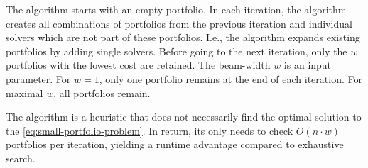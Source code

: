 The algorithm starts with an empty portfolio.
In each iteration, the algorithm creates all combinations of portfolios from the previous iteration and individual solvers which are not part of these portfolios.
I.e., the algorithm expands existing portfolios by adding single solvers.
Before going to the next iteration, only the $w$ portfolios with the lowest cost are retained.
The beam-width $w$ is an input parameter.
For $w=1$, only one portfolio remains at the end of each iteration.
For maximal $w$, all portfolios remain.

The algorithm is a heuristic that does not necessarily find the optimal solution to the \ref{eq:small-portfolio-problem}.
In return, its only needs to check $O(n \cdot w)$ portfolios per iteration, yielding a runtime advantage compared to exhaustive search.
